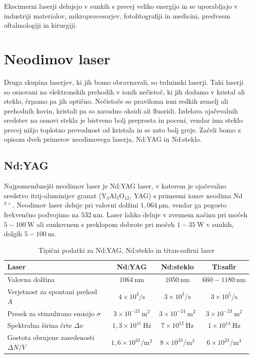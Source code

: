 Ekscimerni laserji delujejo v sunkih s precej veliko energijo in se uporabljajo 
v industriji materialov, mikroprocesorjev, fotolitografiji in medicini, predvsem 
oftalmologiji in kirurgiji.

\section{Neodimov laser}
Druga skupina laserjev, ki jih bomo obravnavali, so trdninski laserji. Taki laserji
so osnovani na elektronskih prehodih v ionih nečistoč, ki jih dodamo v kristal ali steklo,
črpamo pa jih optično. Nečistoče so praviloma ioni redkih zemelj ali prehodnih kovin, 
kristali pa so navadno oksidi ali fluoridi. Izdelava ojačevalnih sredstev na osnovi stekla
je bistveno bolj preprosta in poceni, vendar ima steklo precej nižjo toplotno prevodnost
od kristala in se zato bolj greje. 
Začeli bomo z opisom dveh primerov neodimovega laserja, Nd:YAG in Nd:steklo.

\subsection{Nd:YAG}
Najpomembnejši neodimov laser je Nd:YAG laser, v katerem je ojačevalno sredstvo
itrij-aluminijev granat (Y$_3$Al$_5$O$_{12}$, YAG) s primesmi ionov neodima Nd$^{3+}$. 
Neodimov laser deluje pri valovni dolžini $1,064~\si{\micro\meter}$, vendar ga pogosto
frekvenčno podvojimo na $532~\si{\nano\metre}$. Laser lahko deluje v zveznem 
načinu pri močeh $5-100~\si{\watt}$ ali sunkovnem s preklopom dobrote
pri močeh $1-35~\si{\watt}$ v sunkih, dolgih $5-100~\si{\nano\second}$.

\begin{table}[h]
\begin{center}
\begin{tabular}{|l|c|c|c|}\hline
Laser & Nd:YAG & Nd:steklo & Ti:safir \\ \hline
Valovna dolžina  & $1064~\si{\nano\metre}$ & $1050~\si{\nano\metre}$ & 
 $660-1180~\si{\nano\metre}$\\ \hline
Verjetnost za spontani prehod $A$ & $4 \times 10^3/\si{\second}$ & $3 \times 10^3/\si{\second}$
& $3 \times 10^5/\si{\second}$\\ \hline
Presek za stimulirano emisijo $\sigma$ & $3 \times 10^{-23}~\si{\metre}^2$ &
$3 \times 10^{-24}~\si{\metre}^2$ & $3 \times 10^{-23}~\si{\metre}^2$\\ \hline
Spektralna širina črte $\Delta \nu$ & $1,3 \times 10^{11}~\si{\hertz}$ &
$7 \times 10^{12}~\si{\hertz}$ & $1 \times 10^{14}~\si{\hertz}$\\ \hline
Gostota obrnjene zasedenosti $\Delta N/V$ & $1,6 \times 10^{23}/\si{\metre}^3$ &
$8 \times 10^{23}/\si{\metre}^3$ & $6 \times 10^{23}/\si{\metre}^3$\\ \hline
\end{tabular}
\caption{Tipični podatki za Nd:YAG, Nd:steklo in titan-safirni laser}
\label{tab:nd}
\end{center}
\end{table}

